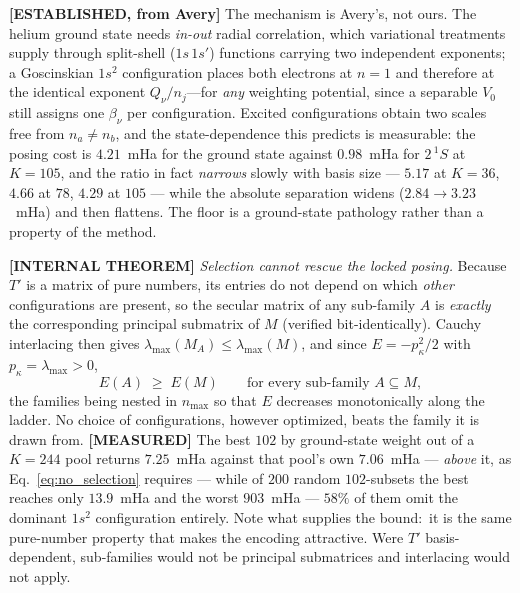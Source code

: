 \documentclass[aps,pra,twocolumn,superscriptaddress,longbibliography]{revtex4-2}
\newcommand{\gvq}[2]{#2}
\begin{document}
\textbf{[ESTABLISHED, from Avery]} The mechanism is Avery's, not ours.  The
helium ground state needs \emph{in-out} radial correlation, which variational
treatments supply through split-shell ($1s\,1s'$) functions carrying two
independent exponents;  a Goscinskian $1s^{2}$ configuration places both
electrons at $n=1$ and therefore at the identical exponent $Q_\nu/n_j$---for
\emph{any} weighting potential, since a separable $V_0$ still assigns one
$\beta_\nu$ per configuration.  Excited configurations obtain two scales free
from $n_a\neq n_b$, and the state-dependence this predicts is measurable:  the
posing cost is $\gvq{p60_posing_cost_ground}{4.21}$~mHa for the ground state
against $\gvq{p60_posing_cost_exc}{0.98}$~mHa for $2\,^{1}S$ at $K=105$, and the
ratio in fact \emph{narrows} slowly with basis size --- $5.17$ at $K=36$,
$4.66$ at $78$, $4.29$ at $105$ --- while the absolute separation widens
($2.84\to3.23$~mHa) and then flattens.  The floor is a ground-state pathology
rather than a
property of the method.

\textbf{[INTERNAL THEOREM]} \emph{Selection cannot rescue the locked
posing.}  Because $T'$ is a matrix of pure numbers, its entries do not depend on
which \emph{other} configurations are present, so the secular matrix of any
sub-family $A$ is \emph{exactly} the corresponding principal submatrix of $M$
(verified bit-identically).  Cauchy interlacing then gives
$\lambda_{\max}(M_A)\le\lambda_{\max}(M)$, and since $E=-p_\kappa^{2}/2$ with
$p_\kappa=\lambda_{\max}>0$,
\begin{equation}
  E(A)\;\ge\;E(M)\qquad\text{for every sub-family } A\subseteq M,
  \label{eq:no_selection}
\end{equation}
the families being nested in $n_{\max}$ so that $E$ decreases monotonically along
the ladder.  No choice of configurations, however optimized, beats the family it
is drawn from.  \textbf{[MEASURED]} The best $102$ by ground-state weight out of
a $K=244$ pool returns $\gvq{p60_best102_locked}{7.25}$~mHa against that pool's
own $7.06$~mHa --- \emph{above} it, as Eq.~\eqref{eq:no_selection} requires ---
while of $200$ random $102$-subsets the best reaches only
$13.9$~mHa and the worst $903$~mHa --- $58\%$ of them omit the dominant $1s^{2}$
configuration entirely.  Note what supplies the
bound:\ it is the same pure-number property that makes the encoding attractive.
Were $T'$ basis-dependent, sub-families would not be principal submatrices and
interlacing would not apply.
\end{document}
